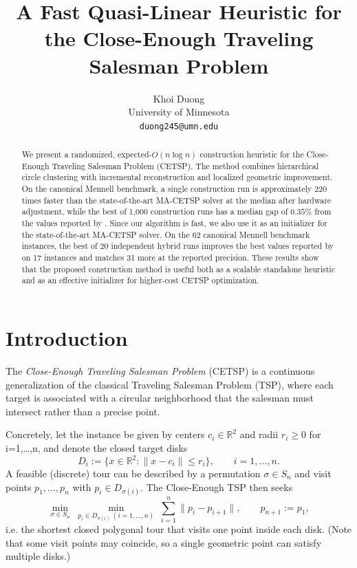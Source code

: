 \documentclass[11pt]{article}
\title{\vspace{-2em}\textbf{A Fast Quasi-Linear Heuristic for the Close-Enough Traveling Salesman Problem}\vspace{-1em}}
\date{} %
\author{
Khoi Duong \\
University of Minnesota \\
\texttt{duong245@umn.edu}
}
\begin{document}
\maketitle
\vspace{-2em}

\begin{abstract}
We present a randomized, expected-$O(n\log n)$ construction heuristic for the Close-Enough Traveling Salesman Problem (CETSP). The method combines hierarchical circle clustering with incremental reconstruction and localized geometric improvement. On the canonical Mennell benchmark, a single construction run is approximately 220 times faster than the state-of-the-art MA-CETSP solver \parencite{LeiHao2024} at the median after hardware adjustment, while the best of 1,000 construction runs has a median gap of \(0.35\%\) from the values reported by \textcite{LeiHao2024}. Since our algorithm is fast, we also use it as an initializer for the state-of-the-art MA-CETSP solver. On the 62 canonical Mennell benchmark instances, the best of 20 independent hybrid runs improves the best values reported by \textcite{LeiHao2024} on 17 instances and matches 31 more at the reported precision. These results show that the proposed construction method is useful both as a scalable standalone heuristic and as an effective initializer for higher-cost CETSP optimization.
\end{abstract}

\section{Introduction}

The \emph{Close-Enough Traveling Salesman Problem} (CETSP) is a continuous generalization of the classical Traveling Salesman Problem (TSP), where each target is associated with a circular neighborhood that the salesman must intersect rather than a precise point.

Concretely, let the instance be given by centers \(c_i\in\mathbb{R}^2\) and radii \(r_i\ge0\) for i=1,\dots,n, and denote the closed target disks
\[
D_i := \{x\in\mathbb{R}^2:\|x-c_i\|\le r_i\},\qquad i=1,\dots,n.
\]
A feasible (discrete) tour can be described by a permutation \(\sigma\in S_n\) and visit points \(p_1,\dots,p_n\) with \(p_i\in D_{\sigma(i)}\). The Close-Enough TSP then seeks
\[
\min_{\sigma\in S_n}\;\min_{p_i\in D_{\sigma(i)}\ (i=1,\dots,n)}
\; \sum_{i=1}^n \|p_i-p_{i+1}\|,\qquad p_{n+1}:=p_1,
\]
i.e. the shortest closed polygonal tour that visits one point inside each disk. (Note that some visit points may coincide, so a single geometric point can satisfy multiple disks.)
\end{document}
